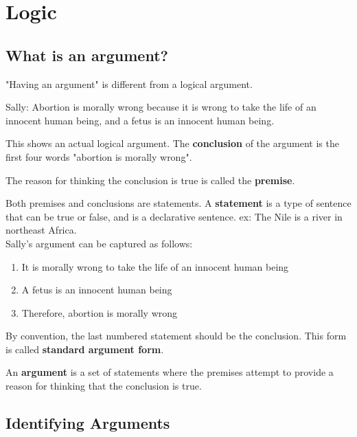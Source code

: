 \section{Logic}

\subsection{What is an argument?}

\begin{readingnotes}
	"Having an argument" is different from a logical argument.
\end{readingnotes}

\begin{keyquote}
	Sally: Abortion is morally wrong because it is wrong to take the life of an
	innocent human being, and a fetus is an innocent human being.
\end{keyquote}

\begin{readingnotes}
	This shows an actual logical argument. The \textbf{conclusion} of the argument
	is the first four words "abortion is morally wrong".

	The reason for thinking the conclusion is true is called the \textbf{premise}.

	Both premises and conclusions are statements. A \textbf{statement} is a type of
	sentence that can be true or false, and is a declarative sentence.
	ex: The Nile is a river in northeast Africa.\\

	Sally's argument can be captured as follows:
	\begin{enumerate}
		\item It is morally wrong to take the life of an innocent human being
		\item A fetus is an innocent human being
		\item Therefore, abortion is morally wrong
	\end{enumerate}

	By convention, the last numbered statement should be the conclusion. This form
	is called \textbf{standard argument form}.

	An \textbf{argument} is a set of statements where the premises attempt to
	provide a reason for thinking that the conclusion is true.
\end{readingnotes}

\subsection{Identifying Arguments}

